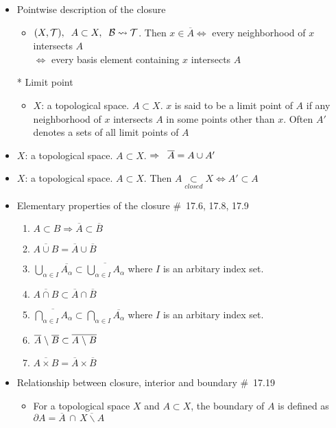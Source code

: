 \documentclass[12pt]{article}
\newcommand{\sptwo}{\hspace{0.2cm}}
\newcommand{\spone}{\hspace{0.1cm}}
\newcommand{\closed}{\underset{closed}{\subset}}
\newcommand{\cl}{\overline}
\newcommand{\diff}{\spone\backslash\spone}
\begin{document}
\begin{itemize}
	\item Pointwise description of the closure
	\begin{itemize}
		\item $(X,\mathcal{T}),\sptwo  A\subset X, \sptwo \mathcal{B}\rightsquigarrow \mathcal{T}$. Then $x\in \overline{A} \Leftrightarrow$ every neighborhood of $x$ intersects $A$ \\$\Leftrightarrow$ every basis element containing $x$ intersects $A$
	\end{itemize}
	\item[*] Limit point
	\begin{itemize}
		\item $X$: a topological space. $A\subset X$. $x$ is said to be a limit point of $A$ if any neighborhood of $x$ intersects $A$ in some points other than $x$. Often $A'$ denotes a sets of all limit points of $A$
	\end{itemize}
	\item $X$: a topological space. $A\subset X$. $\Rightarrow \sptwo \overline{A}=A\cup A'$
	\item $X$: a topological space. $A\subset X$. Then $A\closed X \Leftrightarrow A'\subset A$
	\item Elementary properties of the closure	\quad \#\ 17.6, 17.8, 17.9
	\begin{enumerate}
		\item $A\subset B \Rightarrow \cl{A} \subset \cl{B}$
		\item $\cl{A\cup B}=\cl{A}\cup \cl{B}$
		\item $\bigcup_{\alpha\in I}\cl{A_\alpha}\subset \cl{\bigcup_{\alpha\in I}A_\alpha} $ where $I$ is an arbitary index set.
		\item $\cl{A\cap B}\subset \cl{A}\cap \cl{B}$
		\item $\cl{\bigcap_{\alpha\in I}A_\alpha}\subset \bigcap_{\alpha\in I}\cl{A_\alpha} $ where $I$ is an arbitary index set.
		\item $\cl{A}\diff\cl{B}\subset \cl{A\diff B}$
		\item $\cl{A\times B}=\cl{A}\times \cl{B}$
	\end{enumerate}
	\item Relationship between closure, interior and boundary \quad \#\ 17.19	
	\begin{itemize}
		\item For a topological space $X$ and $A\subset X$, the boundary of $A$ is defined as $\partial{A}=\cl{A}\,\cap\,\cl{X\backslash A}$
		\begin{enumerate}

\end{enumerate}
\end{itemize}
\end{itemize}
\end{document}
